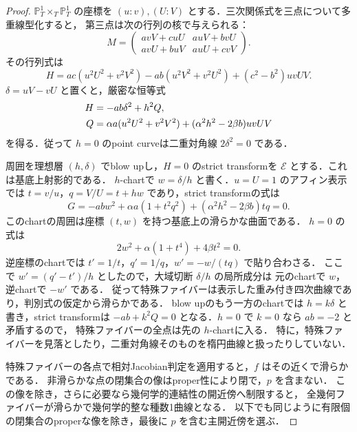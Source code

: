 \begin{proof}
$\mathbb P^1_T\times_T\mathbb P^1_T$ の座標を
$(u:v),(U:V)$ とする．三次関係式を三点について多重線型化すると，
第三点は次の行列の核で与えられる：
\[
 M=\begin{pmatrix}
 avV+cuU&auV+bvU\\
 avU+buV&auU+cvV
 \end{pmatrix}.
\]
その行列式は
\begin{equation}\label{eq:elliptic-point-determinant}
 H=ac(u^2U^2+v^2V^2)-ab(u^2V^2+v^2U^2)+(c^2-b^2)uvUV.
\end{equation}
$\delta=uV-vU$ と置くと，厳密な恒等式
\begin{align}
 H&=-ab\delta^2+h^2Q,\label{eq:elliptic-point-blowup}\\
 Q&=\alpha a(u^2U^2+v^2V^2)+(\alpha^2h^2-2\beta b)uvUV\notag
\end{align}
を得る．従って $h=0$ のpoint curveは二重対角線 $2\delta^2=0$ である．

周囲を理想層 $(h,\delta)$ でblow upし，$H=0$ のstrict transformを
$\mathcal E$ とする．これは基底上射影的である．
$h$-chartで $w=\delta/h$ と書く．$u=U=1$ のアフィン表示では
$t=v/u$，$q=V/U=t+hw$ であり，strict transformの式は
\begin{equation}\label{eq:elliptic-resolved-affine}
 G=-ab w^2+\alpha a(1+t^2q^2)+(\alpha^2h^2-2\beta b)tq=0.
\end{equation}
このchartの周囲は座標 $(t,w)$ を持つ基底上の滑らかな曲面である．
$h=0$ の式は
\[
 2w^2+\alpha(1+t^4)+4\beta t^2=0.
\]
逆座標のchartでは $t'=1/t$，$q'=1/q$，$w'=-w/(tq)$ で貼り合わさる．
ここで $w'=(q'-t')/h$ としたので，大域切断 $\delta/h$ の局所成分は
元のchartで $w$，逆chartで $-w'$ である．
従って特殊ファイバーは表示した重み付き四次曲線であり，判別式の仮定から滑らかである．
blow upのもう一方のchartでは $h=k\delta$ と書き，strict transformは
$-ab+k^2Q=0$ となる．$h=0$ で $k=0$ なら $ab=-2$ と矛盾するので，
特殊ファイバーの全点は先の $h$-chartに入る．
特に，特殊ファイバーを見落としたり，二重対角線そのものを楕円曲線と扱ったりしていない．

特殊ファイバーの各点で相対Jacobian判定を適用すると，$f$ はその近くで滑らかである．
非滑らかな点の閉集合の像はproper性により閉で，$p$ を含まない．
この像を除き，さらに必要なら幾何学的連結性の開近傍へ制限すると，
全幾何ファイバーが滑らかで幾何学的整な種数1曲線となる．
以下でも同じように有限個の閉集合のproperな像を除き，最後に $p$ を含む主開近傍を選ぶ．


\end{proof}

